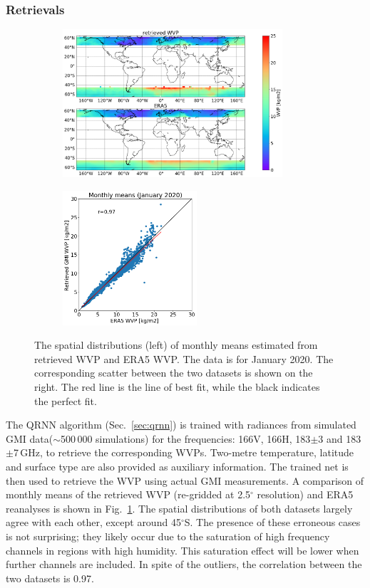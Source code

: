 \documentclass[12pt,oneside,a4paper]{article}
\begin{document}
\subsubsection{Retrievals}
\label{sec:preliminary_results}
\begin{figure}[t]
	\centering
	\begin{subfigure}{.54\textwidth}
		\includegraphics[height = 55mm]{Figures/WVP_spatial_jan2020.png}
	\end{subfigure}
	\begin{subfigure}{.34\textwidth}
	\includegraphics[height = 50mm]{Figures/WVP_scatter_monthlymean.png} 
	\end{subfigure}
	\caption{The spatial distributions (left) of monthly means estimated from retrieved WVP and ERA5 WVP. The data is for January 2020. The corresponding scatter between the two datasets is shown on the right. The red line is the line of best fit, while the black indicates the perfect fit.}
	\label{fig:WVP_retrievals}
\end{figure}

The QRNN algorithm (Sec.~\ref{sec:qrnn}) is trained with radiances from
simulated GMI data($\sim$500\,000 simulations) for the frequencies: 166V, 166H, 183$\pm$3
and 183$\pm$7\,GHz, to retrieve the corresponding WVPs. Two-metre temperature,
latitude and surface type are also provided as auxiliary information. The
trained net is then used to retrieve the WVP using actual GMI measurements. A
comparison of monthly means of the retrieved WVP (re-gridded at 2.5$^{\circ}$
resolution) and ERA5 reanalyses is shown in Fig.~\ref{fig:WVP_retrievals}. The
spatial distributions of both datasets largely agree with each other, except
around 45$^{\circ}$S. The presence of these erroneous cases is not surprising;
they likely occur due to the saturation of high frequency channels in regions
with high humidity. This saturation effect will be lower when further
channels are included. In spite of the outliers, the correlation between the two datasets is 0.97.
\end{document}
